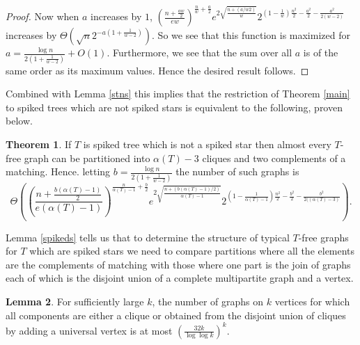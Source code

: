 \documentclass[12pt]{article}
\theoremstyle{definition}
\newtheorem{theorem}{Theorem}[section]
\newtheorem{lemma}[theorem]{Lemma}
\begin{document}
\begin{proof}
Now when $a$ increases by $1$, $(\frac{n+\frac{aw}{2}}{ew})^{\frac{n}{w}+\frac{a}{2}}e^{2\sqrt{\frac{n+(a/w2)}{w}}}2^{(1-\frac{1}{w})\frac{n^2}{2}-\frac{a^2}{2}-\frac{a^2}{2(w-2)}}$ increases by $\Theta(\sqrt{n}2^{-a(1+\frac{1}{w-2})})$. So we see that this function is maximized for  $a=\frac{\log n}{2(1+\frac{1}{w-2})}+O(1)$. Furthermore, 
we see that the sum over all $a$ is of the same order as its maximum values. Hence the desired result follows. 

\end{proof}

Combined with Lemma \ref{stns}  this implies that the restriction of Theorem \ref{main}
to spiked trees which are not spiked stars  is  equivalent to the following, proven below. 


\begin{theorem}
\label{tstns}
If $T$ is   spiked tree  which is not  a spiked star  then almost every $T$-free graph can be partitioned into 
$\alpha(T)-3$ cliques and two complements of a matching. Hence. letting $b=\frac{\log n}{2(1+\frac{1}{w-2})}$  the number of such graphs is 
$$\Theta\left((\frac{n+\frac{b(\alpha(T)-1)}{2}}{e(\alpha(T)-1)})^{\frac{n}{\alpha(T)-1}+\frac{b}{2}}e^{2\sqrt{\frac{n+(b(\alpha(T)-1)/2)}{\alpha(T)-1}}}2^{(1-\frac{1}{\alpha(T)-1})\frac{n^2}{2}-\frac{b^2}{2}-\frac{b^2}{2((\alpha(T)-3)}}\right).$$
\end{theorem}


Lemma \ref{spikeds} tells us that to determine the structure of typical $T$-free graphs for $T$ which are spiked  stars
we need to compare partitions where all the  elements are the complements of matching  with those where one part 
is the join of graphs each of which is the disjoint union of a complete multipartite graph and a vertex. 


\begin{lemma}\label{graphcount2}
For sufficiently large $k$, the number of graphs on $k$ vertices for which all components are either a clique or obtained from the disjoint union of cliques by adding a universal vertex is at most $\left(\frac{32k}{\log \log k}\right)^k$.
\end{lemma}
\end{document}
